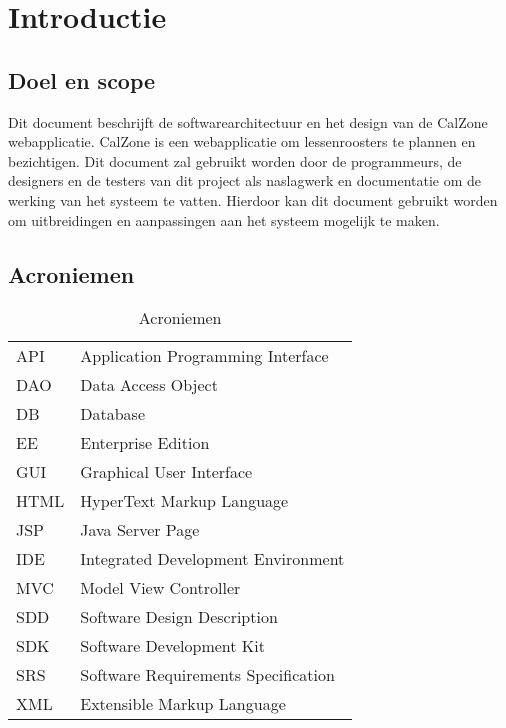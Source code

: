 \chapter{Introductie}

\section{Doel en scope}
Dit document beschrijft de softwarearchitectuur en het design van de CalZone webapplicatie.
CalZone is een webapplicatie om lessenroosters te plannen en bezichtigen.
Dit document zal gebruikt worden door de programmeurs, de designers en de testers van dit project als naslagwerk en documentatie om de werking van het systeem te vatten. 
Hierdoor kan dit document gebruikt worden om uitbreidingen en aanpassingen aan het systeem mogelijk te maken.


\section{Acroniemen}

\begin{table}[H]
	\centering
	\caption{Acroniemen}
	\label{tab:Acroniemen}
	\begin{tabular}{l | l}
	
	API	& Application Programming Interface\\
	
	DAO	& Data Access Object\\

	DB	& Database\\
	
	EE	& Enterprise Edition\\

	GUI	& Graphical User Interface\\
	
	HTML	& HyperText Markup Language\\

	JSP & Java Server Page\\
	
	IDE	& Integrated Development Environment\\

	MVC & Model View Controller\\ 

	SDD	& Software Design Description\\

	SDK	& Software Development Kit\\

	SRS	& Software Requirements Specification\\
	
	XML & Extensible Markup Language\\
	
	\end{tabular}
\end{table}


